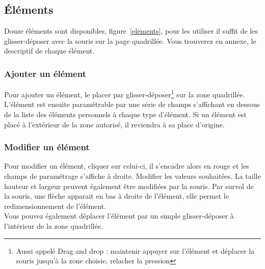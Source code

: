 \documentclass[a4paper,11pt,final]{report}
\begin{document}
\subsection{Éléments}
Douze éléments sont disponibles, figure~\ref{elements}, pour les utiliser il suffit de les glisser-déposer avec la souris sur la page quadrillée. Vous trouverez en annexe, le descriptif de chaque élément.

\noindent\begin{minipage}{\linewidth}%
\label{elements}
\end{minipage}

\subsubsection{Ajouter un élément}
Pour ajouter un élément, le placer par glisser-déposer\footnote{Aussi appelé Drag and drop : maintenir appuyer sur l'élément et déplacer la souris jusqu'à la zone choisie, relacher la pression} sur la zone quadrillée.\\ 
L'élément est ensuite paramétrable par une série de champs s'affichant en dessous de la liste des éléments personnels à chaque type d'élément.
Si un élément est placé à l'extérieur de la zone autorisé, il reviendra à sa place d'origine.

\subsubsection{Modifier un élément}
Pour modifier un élément, cliquer sur celui-ci, il s'encadre alors en rouge et les champs de paramétrage s'affiche à droite. Modifier les valeurs souhaitées. La taille hauteur et largeur peuvent également être modifiées par la souris. Par survol de la souris, une flèche apparait en bas à droite de l'élément, elle permet le redimensionnement de l'élément.\\
Vous pouvez également déplacer l'élément par un simple glisser-déposer à l'intérieur de la zone quadrillée.
\end{document}
